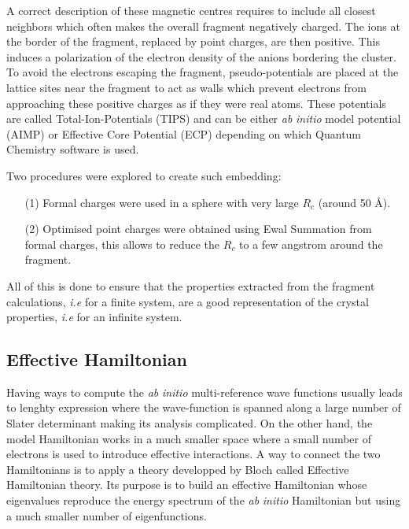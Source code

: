 \documentclass[10pt]{report}
\numberwithin{equation}{section}
\begin{document}
A correct description of these magnetic centres requires to include all closest neighbors which often makes the overall fragment negatively charged.
The ions at the border of the fragment, replaced by point charges, are then positive. This induces a polarization of the electron density of the anions bordering the cluster.
To avoid the electrons escaping the fragment, pseudo-potentials are placed at the lattice sites near the fragment to act as walls which prevent electrons from approaching these positive charges as if they were real atoms.
These potentials are called Total-Ion-Potentials (TIPS) and can be either \textit{ab} \textit{initio} model potential (AIMP) or Effective Core Potential (ECP) depending on which Quantum Chemistry software is used.

Two procedures were explored to create such embedding:
\begin{itemize}
    \item[(1)] Formal charges were used in a sphere with very large $R_c$ (around 50 \AA{}).
    \item[(2)] Optimised point charges were obtained using Ewal Summation from formal charges, this allows to reduce the $R_c$ to a few angstrom around the fragment.
\end{itemize}

All of this is done to ensure that the properties extracted from the fragment calculations, \textit{i.e} for a finite system, are a good representation of the crystal properties, \textit{i.e} for an infinite system.

\subsection{Effective Hamiltonian}

Having ways to compute the \textit{ab} \textit{initio} multi-reference wave functions usually leads to lenghty expression where the wave-function is spanned along a large number of Slater determinant making its analysis complicated.
On the other hand, the model Hamiltonian works in a much smaller space where a small number of electrons is used to introduce effective interactions.
A way to connect the two Hamiltonians is to apply a theory developped by Bloch called Effective Hamiltonian theory. 
Its purpose is to build an effective Hamiltonian whose eigenvalues reproduce the energy spectrum of the \textit{ab} \textit{initio} Hamiltonian but using a much smaller number of eigenfunctions.
\end{document}
